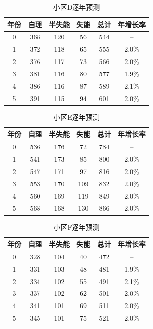 \documentclass[UTF8]{ctexart}
\begin{document}
\begin{table}[H]
\centering
\caption{小区D逐年预测}
\renewcommand{\arraystretch}{1.3}
\begin{tabular}{|c|c|c|c|c|c|}
\hline
\textbf{年份} & \textbf{自理} & \textbf{半失能} & \textbf{失能} & \textbf{总计} & \textbf{年增长率} \\
\hline
0 & 368 & 120 & 56 & 544 & -- \\
\hline
1 & 372 & 118 & 65 & 555 & 2.0\% \\
\hline
2 & 376 & 117 & 73 & 566 & 2.0\% \\
\hline
3 & 381 & 116 & 80 & 577 & 1.9\% \\
\hline
4 & 386 & 116 & 87 & 589 & 2.1\% \\
\hline
5 & 391 & 115 & 94 & 601 & 2.0\% \\
\hline
\end{tabular}
\end{table}

\begin{table}[H]
\centering
\caption{小区E逐年预测}
\renewcommand{\arraystretch}{1.3}
\begin{tabular}{|c|c|c|c|c|c|}
\hline
\textbf{年份} & \textbf{自理} & \textbf{半失能} & \textbf{失能} & \textbf{总计} & \textbf{年增长率} \\
\hline
0 & 536 & 176 & 72 & 784 & -- \\
\hline
1 & 541 & 173 & 85 & 800 & 2.0\% \\
\hline
2 & 547 & 171 & 97 & 816 & 2.0\% \\
\hline
3 & 553 & 170 & 109 & 832 & 2.0\% \\
\hline
4 & 560 & 169 & 119 & 849 & 2.0\% \\
\hline
5 & 568 & 168 & 130 & 866 & 2.0\% \\
\hline
\end{tabular}
\end{table}

\begin{table}[H]
\centering
\caption{小区F逐年预测}
\renewcommand{\arraystretch}{1.3}
\begin{tabular}{|c|c|c|c|c|c|}
\hline
\textbf{年份} & \textbf{自理} & \textbf{半失能} & \textbf{失能} & \textbf{总计} & \textbf{年增长率} \\
\hline
0 & 328 & 104 & 40 & 472 & -- \\
\hline
1 & 331 & 103 & 48 & 481 & 1.9\% \\
\hline
2 & 334 & 102 & 55 & 491 & 2.1\% \\
\hline
3 & 337 & 102 & 62 & 501 & 2.0\% \\
\hline
4 & 341 & 101 & 69 & 511 & 2.0\% \\
\hline
5 & 345 & 101 & 75 & 521 & 2.0\% \\
\hline
\end{tabular}
\end{table}
\end{document}
